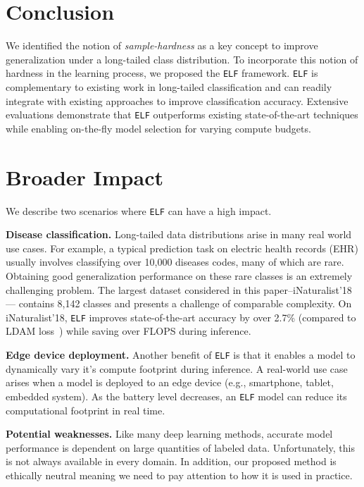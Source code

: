 \documentclass{article}
\newcommand{\method}{\texttt{ELF}\xspace}
\begin{document}
 \section{Conclusion}
We identified the notion of \textit{sample-hardness} as a key concept to improve generalization under a long-tailed class distribution. 
To incorporate this notion of hardness in the learning process, we proposed the \method{} framework. 
\method{} is complementary to existing work in long-tailed classification and can readily integrate with existing approaches to improve classification accuracy. 
Extensive evaluations demonstrate that \method{} outperforms existing state-of-the-art techniques while enabling on-the-fly model selection for varying compute budgets.  

\section*{Broader Impact}
We describe two scenarios where \method{} can have a high impact.

\textbf{Disease classification.} Long-tailed data distributions arise in many real world use cases.
For example, a typical prediction task on electric health records (EHR) usually involves classifying over 10,000 diseases codes, many of which are rare. 
Obtaining good generalization performance on these rare classes is an extremely challenging problem. 
The largest dataset considered in this paper--iNaturalist'18--- contains 8,142 classes and presents a challenge of comparable complexity. 
On iNaturalist'18, \method{} improves state-of-the-art accuracy by over 2.7\% (compared to LDAM loss~\cite{cao2019learning}) while saving over  FLOPS during inference. 

\textbf{Edge device deployment.} Another benefit of \method{} is that it enables a model to dynamically vary it's compute footprint during inference.
A real-world use case arises when a model is deployed to an edge device (e.g., smartphone, tablet, embedded system).
As the battery level decreases, an \method{} model can reduce its computational footprint in real time. 

\textbf{Potential weaknesses.} Like many deep learning methods, accurate model performance is dependent on large quantities of labeled data.
Unfortunately, this is not always available in every domain. 
In addition, our proposed method is ethically neutral meaning we need to pay attention to how it is used in practice. 
\end{document}
